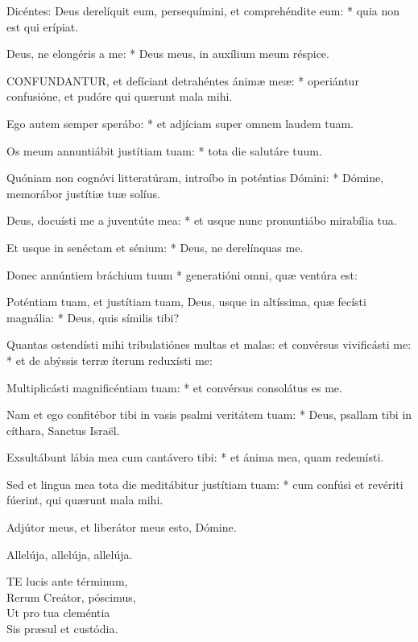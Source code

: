Dicéntes: Deus derelíquit eum, persequímini, et comprehéndite eum: * quia non est qui erípiat.

Deus, ne elongéris a me: * Deus meus, in auxílium meum réspice.


\lettrine[lines=2]{C}{ONFUNDANTUR}, et defíciant detrahéntes ánimæ meæ: * operiántur confusióne, et pudóre qui quærunt mala mihi.

Ego autem semper sperábo: * et adjíciam super omnem laudem tuam.

Os meum annuntiábit justítiam tuam: * tota die salutáre tuum.

Quóniam non cognóvi litteratúram, introíbo in poténtias Dómini: * Dómine, memorábor justítiæ tuæ solíus.

Deus, docuísti me a juventúte mea: * et usque nunc pronuntiábo mirabília tua.

Et usque in senéctam et sénium: * Deus, ne derelínquas me.

Donec annúntiem bráchium tuum * generatióni omni, quæ ventúra est:

Poténtiam tuam, et justítiam tuam, Deus, usque in altíssima, quæ fecísti magnália: * Deus, quis símilis tibi?

Quantas ostendísti mihi tribulatiónes multas et malas: et convérsus vivificásti me: * et de abýssis terræ íterum reduxísti me:

Multiplicásti magnificéntiam tuam: * et convérsus consolátus es me.

Nam et ego confitébor tibi in vasis psalmi veritátem tuam: * Deus, psallam tibi in cíthara, Sanctus Israël.

Exsultábunt lábia mea cum cantávero tibi: * et ánima mea, quam redemísti.

Sed et lingua mea tota die meditábitur justítiam tuam: * cum confúsi et revériti fúerint, qui quærunt mala mihi.


 Adjútor meus, et liberátor meus esto, Dómine.


 Allelúja, allelúja, allelúja.


\lettrine[lines=2]{T}{E} lucis ante términum,\\
Rerum Creátor, póscimus,\\
Ut pro tua cleméntia\\
Sis præsul et custódia.

